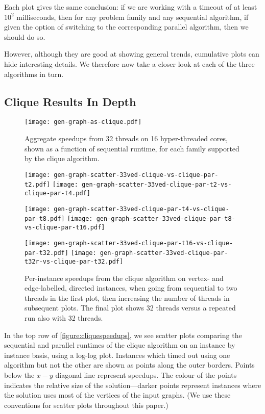 \documentclass[sigconf]{acmart}
\begin{document}
Each plot gives the same conclusion: if we are working with a timeout of at least $10^2$
milliseconds, then for any problem family and any sequential algorithm, if given the option of
switching to the corresponding parallel algorithm, then we should do so.

However, although they are good at showing general trends, cumulative plots can hide interesting
details. We therefore now take a closer look at each of the three algorithms in turn.

\subsection{Clique Results In Depth}

\begin{figure}[p]
    \texttt{[image: gen-graph-as-clique.pdf]}

    \caption{Aggregate speedups from 32 threads on 16 hyper-threaded cores, shown as a function of
    sequential runtime, for each family supported by the clique algorithm.}\label{figure:cliqueas}
\end{figure}
\begin{figure}[p]
    \texttt{[image: gen-graph-scatter-33ved-clique-vs-clique-par-t2.pdf]}
    \hfill
    \texttt{[image: gen-graph-scatter-33ved-clique-par-t2-vs-clique-par-t4.pdf]}

    \vspace*{1em}

    \texttt{[image: gen-graph-scatter-33ved-clique-par-t4-vs-clique-par-t8.pdf]}
    \hfill
    \texttt{[image: gen-graph-scatter-33ved-clique-par-t8-vs-clique-par-t16.pdf]}

    \vspace*{1em}

    \texttt{[image: gen-graph-scatter-33ved-clique-par-t16-vs-clique-par-t32.pdf]}
    \hfill
    \texttt{[image: gen-graph-scatter-33ved-clique-par-t32r-vs-clique-par-t32.pdf]}

    \caption{Per-instance speedups from the clique algorithm on vertex- and edge-labelled, directed
    instances, when going from sequential to two threads in the first plot, then increasing the
    number of threads in subsequent plots. The final plot shows 32 threads versus a repeated run
    also with 32 threads.}\label{figure:cliquescale}
\end{figure}

In the top row of \cref{figure:cliquespeedups}, we see scatter plots comparing the sequential and
parallel runtimes of the clique algorithm on an instance by instance basis, using a log-log plot.
Instances which timed out using one algorithm but not the other are shown as points along the outer
borders. Points below the $x{-}y$ diagonal line represent speedups. The colour of the points indicates
the relative size of the solution---darker points represent instances where the solution uses most
of the vertices of the input graphs. (We use these conventions for scatter plots throughout this
paper.)
\end{document}
